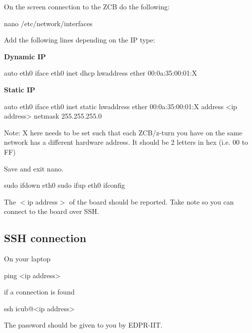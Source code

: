 On the {\ttfamily screen} connection to the Z\+CB do the following\+: 
\begin{DoxyCode}
nano /etc/network/interfaces
\end{DoxyCode}
 Add the following lines depending on the IP type\+:
\begin{DoxyItemize}
\item {\bfseries Dynamic IP} 
\begin{DoxyCode}
auto eth0
iface eth0 inet dhcp
hwaddress ether 00:0a:35:00:01:X
\end{DoxyCode}

\item {\bfseries Static IP} 
\begin{DoxyCode}
auto eth0
iface eth0 inet static
hwaddress ether 00:0a:35:00:01:X
address <ip address>
netmask 255.255.255.0
\end{DoxyCode}

\end{DoxyItemize}

Note\+: X here needs to be set such that each Z\+C\+B/z-\/turn you have on the same network has a different hardware address. It should be 2 letters in hex (i.\+e. 00 to FF)

Save and exit {\ttfamily nano}.


\begin{DoxyCode}
sudo ifdown eth0
sudo ifup eth0
ifconfig
\end{DoxyCode}


The {\ttfamily $<$ip address$>$} of the board should be reported. Take note so you can connect to the board over S\+SH.

\subsection*{S\+SH connection}

On your laptop 
\begin{DoxyCode}
ping <ip address>
\end{DoxyCode}
 if a connection is found 
\begin{DoxyCode}
ssh icub@<ip address>
\end{DoxyCode}
 The password should be given to you by E\+D\+P\+R-\/\+I\+IT. 